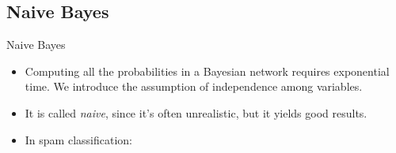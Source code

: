 \documentclass[xcolor=x11names,compress]{beamer}
\renewcommand{\(}{\begin{columns}}
\renewcommand{\)}{\end{columns}}
\newcommand{\<}[1]{\begin{column}{#1}}
\renewcommand{\>}{\end{column}}
\begin{document}


\subsection{Naive Bayes}
\begin{frame}{Naive Bayes}
\begin{itemize}
    \item<1->Computing all the probabilities in a Bayesian network requires exponential time.
      We introduce the assumption of independence among variables.
    \item<2->It is called \textit{naive}, since it's often unrealistic, but it yields good results.
    \item<3->In spam classification:
      \begin{center}
      \end{center}
\end{itemize}
\end{frame}

\end{document}
